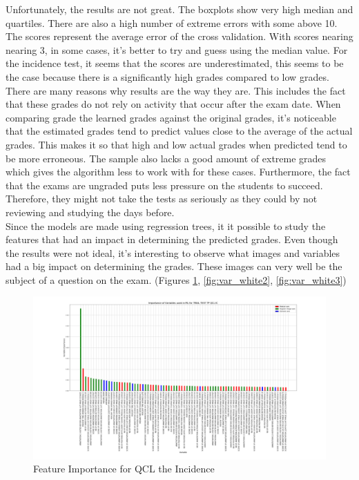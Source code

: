 \documentclass[a4paper,11pt]{report}
\numberwithin{figure}{section} %
\begin{document}
    Unfortunately, the results are not great.
    The boxplots show very high median and quartiles.
    There are also a high number of extreme errors with some above 10.
    The scores represent the average error of the cross validation.
    With scores nearing nearing 3, in some cases, it's better to try and guess using the median value.
    For the incidence test, it seems that the scores are underestimated, this seems to be the case because there is a significantly high grades compared to low grades.
    There are many reasons why results are the way they are.
    This includes the fact that these grades do not rely on activity that occur after the exam date.
    When comparing grade the learned grades against the original grades, it's noticeable that the estimated grades tend to predict values close to the average of the actual grades.
    This makes it so that high and low actual grades when predicted tend to be more erroneous.
    The sample also lacks a good amount of extreme grades which gives the algorithm less to work with for these cases.
    Furthermore, the fact that the exams are ungraded puts less pressure on the students to succeed.
    Therefore, they might not take the tests as seriously as they could by not reviewing and studying the days before. \\
  
  Since the models are made using regression trees, it it possible to study the features that had an impact in determining the predicted grades.
  Even though the results were not ideal, it's interesting to observe what images and variables had a big impact on determining the grades.
  These images can very well be the subject of a question on the exam. (Figures \ref{fig:var_white1}, \ref{fig:var_white2}, \ref{fig:var_white3})

     \begin{figure}[H]
      \centering
      \includegraphics[width=.95\linewidth]{var_importance_TRIAL_TEST_TP_QCL_IC_2018-04-29_14_31_17.png}
      \caption{Feature Importance for QCL the Incidence}
      \label{fig:var_white1}
      \end{figure}
      
\end{document}
